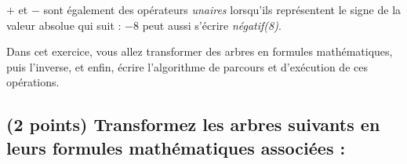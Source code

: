 \documentclass[11pt,a4paper]{article}
\begin{document}
\noindent \og $ + $ \fg{} et \og $ - $ \fg{} sont également des opérateurs \textit{unaires} lorsqu'ils représentent le signe de la valeur absolue qui suit : \og $ - 8 $ \fg{} peut aussi s'écrire \textit{négatif(8)}.

\medskip

\noindent Dans cet exercice, vous allez transformer des arbres en formules mathématiques, puis l'inverse, et enfin, écrire l'algorithme de parcours et d'exécution de ces opérations.


\subsection{(2 points) Transformez les arbres suivants en leurs formules mathématiques associées : }
\end{document}
